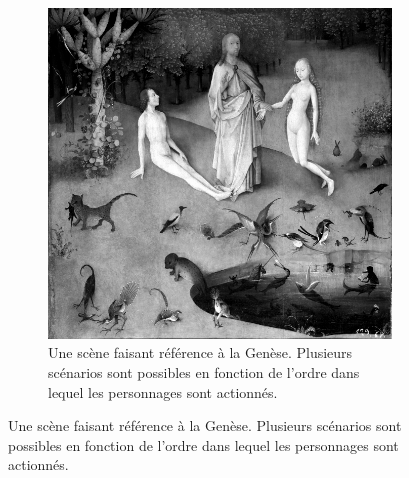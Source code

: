 \begin{subfigure}[t]{0.45\textwidth}
\begin{subfigure}[t]{\textwidth}
    \includegraphics[width=\textwidth]{images/A2.png}
    \caption{Une scène faisant référence à la Genèse. Plusieurs scénarios sont possibles en fonction de l'ordre dans lequel les personnages sont actionnés.}
    \label{fig.a2}
\end{subfigure}   
\label{fig.a}
\end{subfigure}
